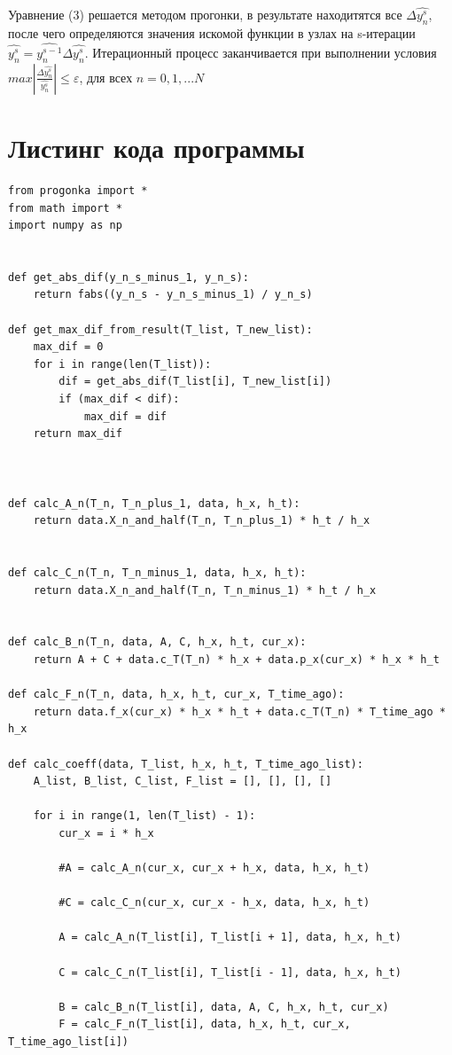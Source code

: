 \documentclass[a4paper,12pt]{article}
\begin{document}
	Уравнение (3) решается методом прогонки, в результате находитятся все $\Delta \widehat{y_n^s}$, после чего определяются значения искомой функции в узлах на s-итерации $\widehat{y_n^s} = \widehat{y_n^{s-1}} \Delta \widehat{y_n^s}$. Итерационный процесс заканчивается при выполнении условия $max\left|\frac{\Delta \widehat{y_n^s}}{\widehat{y_n^s}}\right| \leqslant \varepsilon$, для всех $n = 0,1,... N$
	
	\section*{Листинг кода программы}
	
	\begin{lstlisting}[label=lst0,caption=Реализация задачи]
from progonka import *
from math import *
import numpy as np


def get_abs_dif(y_n_s_minus_1, y_n_s):
	return fabs((y_n_s - y_n_s_minus_1) / y_n_s)

def get_max_dif_from_result(T_list, T_new_list):
	max_dif = 0
	for i in range(len(T_list)):
		dif = get_abs_dif(T_list[i], T_new_list[i])
		if (max_dif < dif):
			max_dif = dif
	return max_dif



def calc_A_n(T_n, T_n_plus_1, data, h_x, h_t):
	return data.X_n_and_half(T_n, T_n_plus_1) * h_t / h_x


def calc_C_n(T_n, T_n_minus_1, data, h_x, h_t):
	return data.X_n_and_half(T_n, T_n_minus_1) * h_t / h_x


def calc_B_n(T_n, data, A, C, h_x, h_t, cur_x):
	return A + C + data.c_T(T_n) * h_x + data.p_x(cur_x) * h_x * h_t

def calc_F_n(T_n, data, h_x, h_t, cur_x, T_time_ago):
	return data.f_x(cur_x) * h_x * h_t + data.c_T(T_n) * T_time_ago * h_x

def calc_coeff(data, T_list, h_x, h_t, T_time_ago_list):
	A_list, B_list, C_list, F_list = [], [], [], []
	
	for i in range(1, len(T_list) - 1):
		cur_x = i * h_x
		
		#A = calc_A_n(cur_x, cur_x + h_x, data, h_x, h_t)
		
		#C = calc_C_n(cur_x, cur_x - h_x, data, h_x, h_t)
		
		A = calc_A_n(T_list[i], T_list[i + 1], data, h_x, h_t)
		
		C = calc_C_n(T_list[i], T_list[i - 1], data, h_x, h_t)
		
		B = calc_B_n(T_list[i], data, A, C, h_x, h_t, cur_x)
		F = calc_F_n(T_list[i], data, h_x, h_t, cur_x, T_time_ago_list[i])
		

\end{lstlisting}
\end{document}
